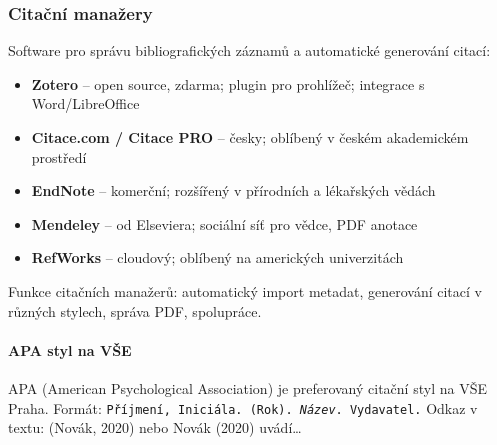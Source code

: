 \subsubsection{Citační manažery}

Software pro správu bibliografických záznamů a automatické generování citací:

\begin{itemize}
  \item \textbf{Zotero} -- open source, zdarma; plugin pro prohlížeč; integrace s Word/LibreOffice
  \item \textbf{Citace.com / Citace PRO} -- česky; oblíbený v českém akademickém prostředí
  \item \textbf{EndNote} -- komerční; rozšířený v přírodních a lékařských vědách
  \item \textbf{Mendeley} -- od Elseviera; sociální síť pro vědce, PDF anotace
  \item \textbf{RefWorks} -- cloudový; oblíbený na amerických univerzitách
\end{itemize}

Funkce citačních manažerů: automatický import metadat, generování citací v různých stylech, správa PDF, spolupráce.

\paragraph{APA styl na VŠE}
APA (American Psychological Association) je preferovaný citační styl na VŠE Praha.
Formát: \texttt{Příjmení, Iniciála. (Rok). \textit{Název}. Vydavatel.}
Odkaz v textu: (Novák, 2020) nebo Novák (2020) uvádí\ldots

